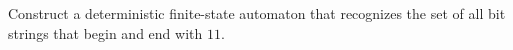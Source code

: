\documentclass[../main.tex]{subfiles}
\begin{document}
Construct a deterministic finite-state automaton that recognizes the set of all bit strings that begin and end with $11$.

\solution
\end{document}
